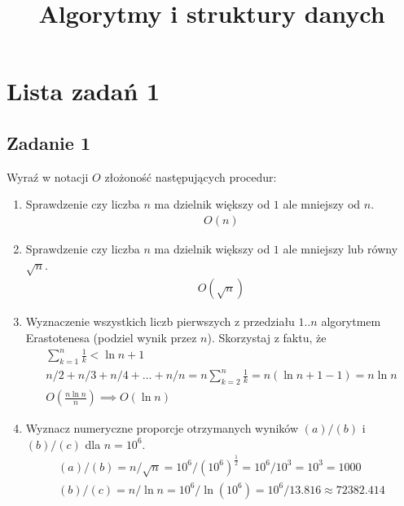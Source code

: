 \documentclass{article}
\begin{document}
\title{Algorytmy i struktury danych}
\author{}
\date{}
\maketitle

\section*{Lista zadań 1}
\subsection*{Zadanie 1}
Wyraź w notacji $O$ złożoność następujących procedur:
\begin{enumerate}[label=(\alph*)]
    \item Sprawdzenie czy liczba $n$ ma dzielnik większy od $1$ ale mniejszy od $n$.
          \begin{gather*}
              O(n)
          \end{gather*}
    \item Sprawdzenie czy liczba $n$ ma dzielnik większy od $1$ ale mniejszy lub równy $\sqrt{n}$.
          \begin{gather*}
              O(\sqrt{n})
          \end{gather*}
    \item Wyznaczenie wszystkich liczb pierwszych z przedziału $1..n$ algorytmem Erastotenesa
          (podziel wynik przez $n$). Skorzystaj z faktu, że
          \begin{gather*}
              \sum_{k=1}^{n} \frac{1}{k} < \ln n + 1 \\
              n/2 + n/3 + n/4 + \dots + n/n = n \sum_{k=2}^{n} \frac{1}{k} = n \left( \ln n + 1 - 1 \right) = n \ln n \\
              O(\frac{n\ln n}{n}) \implies O(\ln n)
          \end{gather*}
    \item Wyznacz numeryczne proporcje otrzymanych wyników $(a)/(b)$ i $(b)/(c)$ dla $n = 10^6$.
          \begin{gather*}
              (a)/(b) = n/\sqrt{n} = 10^6/(10^6)^\frac{1}{2} = 10^6/10^3 = 10^3 = 1000 \\
              (b)/(c) = n/\ln n = 10^6/\ln(10^6) = 10^6/13.816 \approx 72382.414
          \end{gather*}

\end{enumerate}
\end{document}

